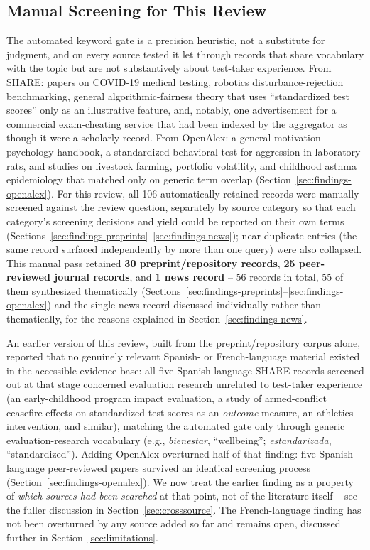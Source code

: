 \documentclass[11pt]{article}
\begin{document}
\subsection{Manual Screening for This Review}
\label{sec:screening}

The automated keyword gate is a precision heuristic, not a substitute for judgment, and on every source tested it let through records that share vocabulary with the topic but are not substantively about test-taker experience. From SHARE: papers on COVID-19 medical testing, robotics disturbance-rejection benchmarking, general algorithmic-fairness theory that uses ``standardized test scores'' only as an illustrative feature, and, notably, one advertisement for a commercial exam-cheating service that had been indexed by the aggregator as though it were a scholarly record. From OpenAlex: a general motivation-psychology handbook, a standardized behavioral test for aggression in laboratory rats, and studies on livestock farming, portfolio volatility, and childhood asthma epidemiology that matched only on generic term overlap (Section~\ref{sec:findings-openalex}). For this review, all 106 automatically retained records were manually screened against the review question, separately by source category so that each category's screening decisions and yield could be reported on their own terms (Sections~\ref{sec:findings-preprints}--\ref{sec:findings-news}); near-duplicate entries (the same record surfaced independently by more than one query) were also collapsed. This manual pass retained \textbf{30 preprint/repository records}, \textbf{25 peer-reviewed journal records}, and \textbf{1 news record} -- 56 records in total, 55 of them synthesized thematically (Sections~\ref{sec:findings-preprints}--\ref{sec:findings-openalex}) and the single news record discussed individually rather than thematically, for the reasons explained in Section~\ref{sec:findings-news}.

An earlier version of this review, built from the preprint/repository corpus alone, reported that no genuinely relevant Spanish- or French-language material existed in the accessible evidence base: all five Spanish-language SHARE records screened out at that stage concerned evaluation research unrelated to test-taker experience (an early-childhood program impact evaluation, a study of armed-conflict ceasefire effects on standardized test scores as an \emph{outcome} measure, an athletics intervention, and similar), matching the automated gate only through generic evaluation-research vocabulary (e.g., \textit{bienestar}, ``wellbeing''; \textit{estandarizada}, ``standardized''). Adding OpenAlex overturned half of that finding: five Spanish-language peer-reviewed papers survived an identical screening process (Section~\ref{sec:findings-openalex}). We now treat the earlier finding as a property of \emph{which sources had been searched} at that point, not of the literature itself -- see the fuller discussion in Section~\ref{sec:crosssource}. The French-language finding has not been overturned by any source added so far and remains open, discussed further in Section~\ref{sec:limitations}.
\end{document}
